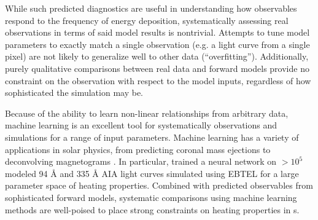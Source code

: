 While such predicted diagnostics are useful in understanding how observables respond to the frequency of energy deposition, systematically assessing real observations in terms of said model results is nontrivial.
Attempts to tune model parameters to exactly match a single observation (e.g. a light curve from a single pixel) are not likely to generalize well to other data (``overfitting'').
Additionally, purely qualitative comparisons between real data and forward models provide no constraint on the observation with respect to the model inputs, regardless of how sophisticated the simulation may be.

Because of the ability to learn non-linear relationships from arbitrary data, machine learning  is an excellent tool for systematically  observations and simulations for a range of input parameters.
Machine learning has a variety of applications in solar physics, from predicting coronal mass ejections \citep[e.g.][]{bobra_predicting_2016} to deconvolving magnetograms \citep{baso_enhancing_2018}.
In particular, \citet{tajfirouze_time-resolved_2016} trained a neural network  on $>10^5$ modeled 94 \AA{} and 335 \AA{} AIA light curves simulated using EBTEL for a large parameter space of heating properties.
Combined with predicted observables from sophisticated forward models, systematic comparisons using machine learning methods are well-poised to place strong constraints on heating properties in \AR s.

